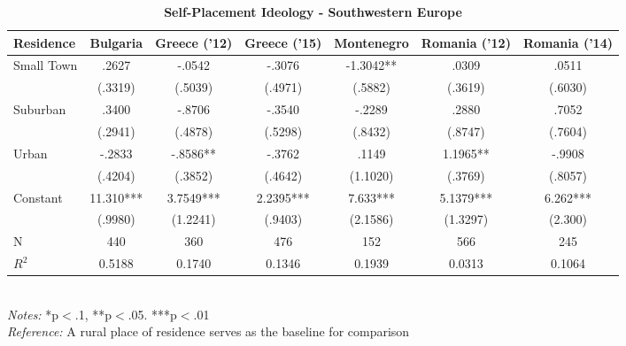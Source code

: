 \documentclass[12pt, titlepage]{article}
\newcommand\e{\emph}
\newcommand\tb{\textbf}
\begin{document}
\begin{landscape}
	\begin{table}
		\centering
		\def\arraystretch{1.5}
		\caption{\tb{Self-Placement Ideology - Southwestern Europe}}
		\begin{tabulary}{\linewidth}{l c c c c c c}
			\\
			\hline
			\tb{Residence}& \tb{Bulgaria}& \tb{Greece ('12)}& \tb{Greece ('15)} & \tb{Montenegro} & \tb{Romania ('12)} & \tb {Romania ('14)}\\
			\hline
			Small Town&.2627 &-.0542 &-.3076 & -1.3042** & .0309 & .0511\\
			&(.3319)& (.5039) & (.4971) & (.5882) & (.3619) & (.6030)\\
			Suburban& .3400 & -.8706 &-.3540 & -.2289  &.2880 &.7052\\
			& (.2941) &(.4878) & (.5298) & (.8432) & (.8747) & (.7604)\\
			Urban& -.2833& -.8586** & -.3762 & .1149& 1.1965** & -.9908\\
			& (.4204)& (.3852) & (.4642) & (1.1020) & (.3769) & (.8057)\\
			Constant& 11.310*** &3.7549*** & 2.2395*** &7.633*** & 5.1379*** & 6.262***\\
			& (.9980) & (1.2241)  & (.9403) & (2.1586)& (1.3297) & (2.300)\\
			N& 440 & 360 & 476 & 152 & 566 &245\\
			$R^2$&0.5188 &0.1740& 0.1346 &0.1939& 0.0313 &0.1064 \\
			\hline
		\end{tabulary}
		\\
		\e{Notes:} *p$<$.1, **p$<$.05. ***p$<$.01 \\
		\e{Reference:} A rural place of residence serves as the baseline for comparison
		\label{table8}
	\end{table}
\end{landscape}
\end{document}
